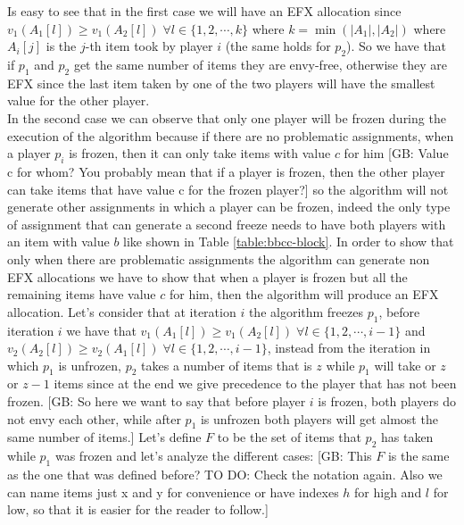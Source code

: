 \documentclass{article}
\newcommand{\gb}[1]{{\color{red}[GB: #1]}}
\begin{document}
Is easy to see that in the first case we will have an EFX allocation since $v_1(A_1[l])\ge v_1(A_2[l])\; \forall l \in \{1,2,\cdots,k\}$ where $k = \min (|A_1|, |A_2|)$ where $A_i[j]$ is the $j$-th item took by player $i$ (the same holds for $p_2$).
So we have that if $p_1$ and $p_2$ get the same number of items they are envy-free, otherwise they are EFX since the last item taken by one of the two players will have the smallest value for the other player.\\
In the second case we can observe that only one player will be frozen during the execution of the algorithm because if there are no problematic assignments, when a player $p_i$ is frozen, then it can only take items with value $c$ for him
\gb{Value c for whom? You probably mean that if a player is frozen, then the other player can take items that have value c for the frozen player?}
so the algorithm will not generate other assignments in which a player can be frozen, indeed the only type of assignment that can generate a second freeze needs to have both players with an item with value $b$ like shown in Table \ref{table:bbcc-block}. In order to show that only when there are problematic assignments the algorithm can generate non EFX allocations we have to show that when a player is frozen but all the remaining items have value $c$ for him, then the algorithm will produce an EFX allocation.
Let's consider that at iteration $i$ the algorithm freezes $p_1$, before iteration $i$ we have that $v_1(A_1[l])\ge v_1(A_2[l]) \; \forall l \in \{1,2,\cdots, i-1\}$ and $v_2(A_2[l]) \ge v_2(A_1[l])\;\forall l \in \{1,2,\cdots,i-1\}$,  instead from the iteration in which $p_1$ is unfrozen, $p_2$ takes a number of items that is $z$ while $p_1$ will take or $z$ or $z-1$ items since at the end we give precedence to the player that has not been frozen.
\gb{So here we want to say that before player $i$ is frozen, both players do not envy each other, while after $p_1$ is unfrozen both players will get almost the same number of items.}
Let's define $F$ to be the set of items that $p_2$ has taken while $p_1$ was frozen and let's analyze the different cases:
\gb{This $F$ is the same as the one that was defined before? TO DO: Check the notation again. Also we can name items just x and y for convenience or have indexes $h$ for high and $l$ for low, so that it is easier for the reader to follow.}
\end{document}
